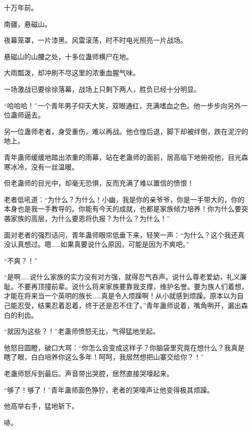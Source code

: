 
\begin{this_body}



十万年前。

南疆，悬磁山。

夜幕笼罩，一片漆黑。风雷滚荡，时不时电光照亮一片战场。

悬磁山的山腰之处，十多位蛊师横尸在地。

大雨瓢泼，却冲刷不尽这里的浓重血腥气味。

一场激战已要徐徐落幕，战场上只剩下两人，胜负已经十分明显。

“哈哈哈！”一个青年男子仰天大笑，双眼通红，充满嗜血之色。他一步步向另外一位蛊师逼去。

另一位蛊师老者，身受重伤，难以再战。他仓惶后退，脚下却被绊倒，跌在泥泞的地上。

青年蛊师缓缓地踏出浓重的雨幕，站在老蛊师的面前，居高临下地俯视他，目光森寒冰冷，没有一丝温暖。

但老蛊师的目光中，却毫无恐惧，反而充满了难以置信的愤恨！

老者低吼道：“为什么？为什么！小幽，我是你的亲爷爷，你是一手带大的，你的本身也是我一手教导的。你能有今天的成就，也都是家族倾力培养！你为什么要突袭家族的高层，为什么要恩将仇报？为什么？为什么！”

面对老者的强烈诘问，青年蛊师眼帘低垂下来，轻笑一声：“为什么？这个我还真没认真想过。嗯……如果真要说什么原因，可能是因为不爽吧。”

“不爽？！”

“是啊……说什么家族的实力没有对方强，就得忍气吞声。说什么尊老爱幼，礼义廉耻。不要再顶撞前辈。说什么将来家族要靠我支撑，维护名誉。要为族人们着想，才能在将来当一个英明的族长……真是令人烦躁啊！从小就感到烦躁。原本以为自己能忍受，结果忍着忍着，终于还是忍不住了。”青年蛊师说着，嘴角咧开，漏出森白的利齿。

“就因为这些？！”老蛊师愤怒无比，气得猛地坐起。

他怒目圆瞪，破口大骂：“你怎么会变成这样子？你脑袋里究竟在想什么？我真是瞎了眼，白白培养你这么多年！呵呵，我居然想把山寨交给你？！”

老蛊师怒斥到最后。声音带出哭腔，居然直接哭嚎起来。

“够了！够了！”青年蛊师面色狰狞，老者的哭嚎声让他变得极其烦躁。

他高举右手，猛地斩下。

哧。


\end{this_body}
